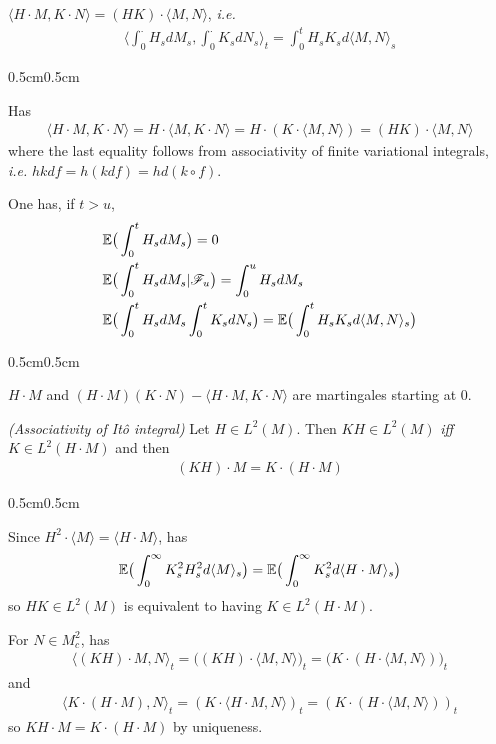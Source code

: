 \documentclass[12pt,a4paper]{article}
\newenvironment{proof}
{\begin{changemargin}{0.5cm}{0.5cm} 
	}%
	{\end{changemargin}
}
\newenvironment{p}
{\begin{proof} 
	}%
	{\end{proof}
}
\begin{document}
\corr $\langle H\cdot M, K\cdot N \rangle = (HK)\cdot \langle M, N \rangle$, \textit{i.e.}
\begin{align*}
\langle \int_0^{\cdot} H_s dM_s , \int_0^{\cdot} K_s dN_s \rangle_t = \int_0^t H_s K_s d\langle M, N \rangle_s 
\end{align*}
\begin{p}
\pf Has
\begin{align*}
\langle H\cdot M, K\cdot N \rangle = H \cdot \langle M, K \cdot N \rangle = H \cdot (K \cdot \langle M, N \rangle) = (HK) \cdot \langle M, N \rangle 
\end{align*}
where the last equality follows from associativity of finite variational integrals, \textit{i.e.} $hk df = h(kdf) = h d(k \circ f)$.

\eop
\end{p}
\s

\corr One has, if $t>u$,
\begin{align*}
& \mathbb{E} \big( \int_0^t H_s dM_s \big) =0 \\
& \mathbb{E} \big( \int_0^t H_s dM_s | \mathscr{F}_u \big) = \int_0^u H_s dM_s \\
& \mathbb{E} \big( \int_0^t H_s dM_s \int_0^t K_s dN_s \big) = \mathbb{E} \big( \int_0^t H_s K_s d\langle M, N \rangle_s \big)
\end{align*} 
\begin{p}
\pf $H\cdot M$ and $(H\cdot M)(K \cdot N) - \langle H\cdot M, K \cdot N \rangle$ are martingales starting at 0.

\eop
\end{p}
\s

\corr \emph{(Associativity of It\^o integral)} Let $H\in L^2(M)$. Then $KH \in L^2(M)$ \emph{iff} $K \in L^2(H \cdot M)$ and then
\begin{align*}
(KH)\cdot M = K\cdot (H \cdot M)
\end{align*}
\begin{p}
\pf Since $H^2 \cdot \langle M \rangle = \langle H \cdot M \rangle$, has
\begin{align*}
\mathbb{E} \big( \int_0^{\infty} K_s^2 H_s^2 d\langle M \rangle_s \big) = \mathbb{E} \big( \int_0^{\infty} K_s^2 d\langle H \cdot M \rangle_s \big)
\end{align*}
so $HK \in L^2(M)$ is equivalent to having $K \in L^2(H \cdot M)$.

\quad For $N \in M_c^2$, has
\begin{align*}
\langle (KH) \cdot M, N \rangle_t = \big( (KH) \cdot \langle M, N \rangle \big)_t = \big(K \cdot(H \cdot \langle M, N \rangle )\big)_t
\end{align*}
and
\begin{align*}
\langle K \cdot (H \cdot M) , N \rangle_t = (K \cdot \langle H \cdot M, N \rangle)_t = (K \cdot (H \cdot \langle M, N \rangle))_t
\end{align*}
so $KH\cdot M = K\cdot (H\cdot M)$ by uniqueness.

\eop
\end{p}
\end{document}
